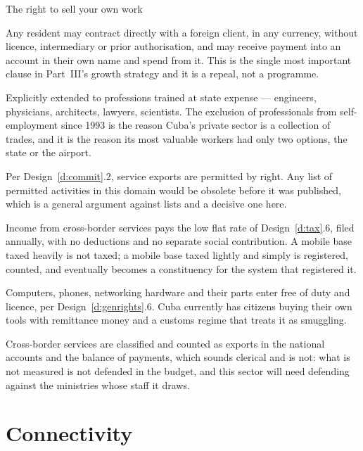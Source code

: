 \begin{design}{The right to sell your own work}
\label{d:contract}
\begin{rules}
 Any resident may contract directly with a foreign client,
in any currency, without licence, intermediary or prior authorisation, and may
receive payment into an account in their own name and spend from it. This is the
single most important clause in Part~III's growth strategy and it is a repeal,
not a programme.

 Explicitly extended to professions trained at state
expense --- engineers, physicians, architects, lawyers, scientists. The exclusion
of professionals from self-employment since 1993 is the reason Cuba's private
sector is a collection of trades, and it is the reason its most valuable workers
had only two options, the state or the airport.

 Per Design~\ref{d:commit}.2, service exports are
permitted by right. Any list of permitted activities in this domain would be
obsolete before it was published, which is a general argument against lists and a
decisive one here.

 Income from cross-border services pays
the low flat rate of Design~\ref{d:tax}.6, filed annually, with no deductions and
no separate social contribution. A mobile base taxed heavily is not taxed; a
mobile base taxed lightly and simply is registered, counted, and eventually
becomes a constituency for the system that registered it.

 Computers, phones, networking hardware and their parts enter
free of duty and licence, per Design~\ref{d:genrights}.6. Cuba currently has
citizens buying their own tools with remittance money and a customs regime that
treats it as smuggling.

 Cross-border services are classified and counted as
exports in the national accounts and the balance of payments, which sounds
clerical and is not: what is not measured is not defended in the budget, and this
sector will need defending against the ministries whose staff it draws.
\end{rules}
\end{design}

\section{Connectivity}


